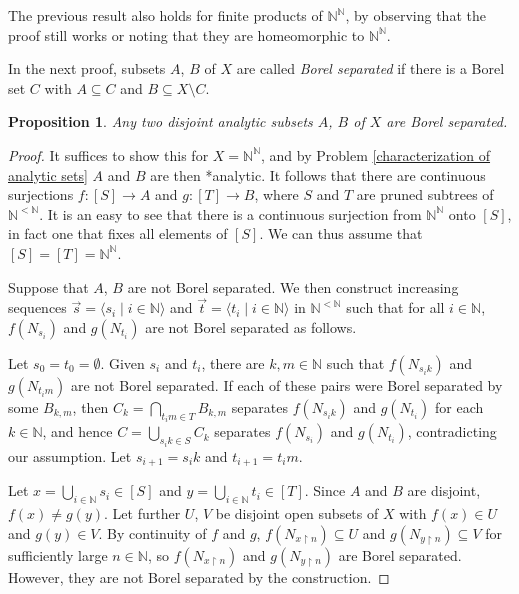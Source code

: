 \documentclass[10pt]{amsart}
\newcommand{\NN}{\mathbb{N}}
\newtheorem{proposition}[theorem]{Proposition}
\theoremstyle{definition}
\theoremstyle{remark}
\begin{document}
The previous result also holds for finite products of $\NN^\NN$, by observing that the proof still works or noting that they are homeomorphic to $\NN^\NN$. 

In the next proof, subsets $A$, $B$ of $X$ are called \emph{Borel separated} if there is a Borel set $C$ with $A\subseteq C$ and $B\subseteq X\setminus C$. 

\begin{proposition} \label{separation of analytic sets} 
Any two disjoint analytic subsets $A$, $B$ of $X$ are Borel separated. 
\end{proposition} 
\begin{proof} 
It suffices to show this for $X=\NN^\NN$, and by Problem \ref{characterization of analytic sets} $A$ and $B$ are then *analytic. 
It follows that there are continuous surjections $f\colon [S]\rightarrow A$ and $g\colon [T]\rightarrow B$, where $S$ and $T$ are pruned subtrees of $\NN^{<\NN}$. 
It is an easy to see that there is a continuous surjection from $\NN^\NN$ onto $[S]$, in fact one that fixes all elements of $[S]$. 
We can thus assume that $[S]=[T]=\NN^\NN$. 

Suppose that $A$, $B$ are not Borel separated. 
We then construct increasing sequences $\vec{s}=\langle s_i\mid i\in\NN\rangle$ and $\vec{t}=\langle t_i\mid i\in\NN\rangle$ in $\NN^{<\NN}$ such that for all $i\in\NN$, $f(N_{s_i})$ and $g(N_{t_i})$ are not Borel separated as follows. 

Let $s_0=t_0=\emptyset$. 
Given $s_i$ and $t_i$, there are $k,m\in \NN$ such that $f(N_{s_i k})$ and $g(N_{t_i m})$ are not Borel separated. 
If each of these pairs were Borel separated by some $B_{k,m}$, then $C_k=\bigcap_{t_i m\in T} B_{k,m}$ separates $f(N_{s_i k})$ and $g(N_{t_i})$ for each $k\in\NN$, and hence $C=\bigcup_{s_i k\in S} C_k$ separates $f(N_{s_i})$ and $g(N_{t_i})$, contradicting our assumption. 
Let $s_{i+1}=s_i k$ and $t_{i+1}= t_i m$. 

Let $x=\bigcup_{i\in\NN} s_i\in [S]$ and $y=\bigcup_{i\in\NN} t_i\in [T]$. 
Since $A$ and $B$ are disjoint, $f(x)\neq g(y)$. 
Let further $U$, $V$ be disjoint open subsets of $X$ with $f(x)\in U$ and $g(y)\in V$. 
By continuity of $f$ and $g$, $f(N_{x{\upharpoonright}n})\subseteq U$ and $g(N_{y{\upharpoonright}n})\subseteq V$ for sufficiently large $n\in\NN$, so $f(N_{x{\upharpoonright}n})$ and $g(N_{y{\upharpoonright}n})$ are Borel separated. 
However, they are not Borel separated by the construction. 
\end{proof} 
\end{document}
